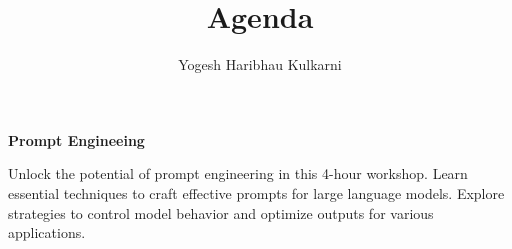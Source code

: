 \documentclass[a4paper, 11pt]{article}
\title{Agenda}
\author{Yogesh Haribhau Kulkarni}
\begin{document}
\pagestyle{mystyle}

\makebox[\linewidth]{}
\begin{center} 
\textbf{\Large Prompt Engineeing}
\end{center}
\makebox[\linewidth]{}


Unlock the potential of prompt engineering in this 4-hour workshop. Learn essential techniques to craft effective prompts for large language models. Explore strategies to control model behavior and optimize outputs for various applications.

\makebox[\linewidth]{}
%
\end{document}
